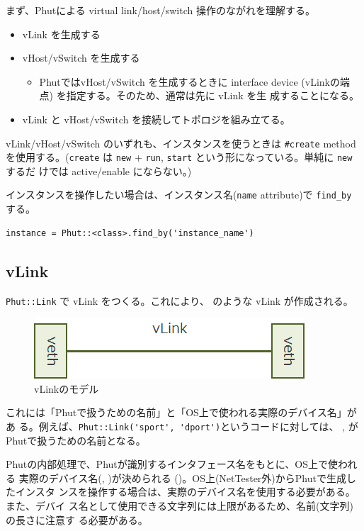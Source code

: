 まず、Phutによる virtual link/host/switch 操作のながれを理解する。
\begin{itemize}
 \item vLink を生成する
 \item vHost/vSwitch を生成する
       \begin{itemize}
        \item PhutではvHost/vSwitch を生成するときに interface device
              (vLinkの端点) を指定する。そのため、通常は先に vLink を生
              成することになる。
       \end{itemize}
 \item vLink と vHost/vSwitch を接続してトポロジを組み立てる。
\end{itemize}

vLink/vHost/vSwitch のいずれも、インスタンスを使うときは \verb|#create|
method を使用する。(\verb|create| は \verb|new| +
\verb|run|, \verb|start| という形になっている。単純に \verb|new| するだ
けでは active/enable にならない。)

インスタンスを操作したい場合は、インスタンス名(\verb|name| attribute)で
\verb|find_by| する。
\begin{lstlisting}
instance = Phut::<class>.find_by('instance_name')
\end{lstlisting}

\subsection{vLink}

\verb|Phut::Link| で vLink をつくる。これにより、
のような vLink が作成される。

\begin{figure}[h]
 \centering
 \includegraphics[scale=0.6]{img/phut-vlink-model.png}
 \caption{vLinkのモデル}
 \label{fig:vlink-model}
\end{figure}

これには「Phutで扱うための名前」と「OS上で使われる実際のデバイス名」があ
る。例えば、\verb|Phut::Link('sport', 'dport')|というコードに対しては、
, がPhutで扱うための名前となる。

Phutの内部処理で、Phutが識別するインタフェース名をもとに、OS上で使われる
実際のデバイス名(, )が決められる
()。OS上(NetTester外)からPhutで生成したインスタ
ンスを操作する場合は、実際のデバイス名を使用する必要がある。また、デバイ
ス名として使用できる文字列には上限があるため、名前(文字列)の長さに注意す
る必要がある。

